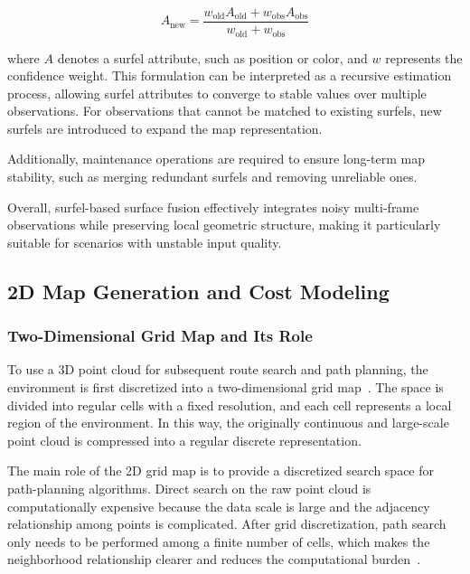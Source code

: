 \documentclass[12pt]{interim_report}
\begin{document}
\begin{equation}
A_{\text{new}} = \frac{w_{\text{old}} A_{\text{old}} + w_{\text{obs}} A_{\text{obs}}}{w_{\text{old}} + w_{\text{obs}}}
\end{equation}

where $A$ denotes a surfel attribute, such as position or color, and $w$ represents the confidence weight. This formulation can be interpreted as a recursive estimation process, allowing surfel attributes to converge to stable values over multiple observations. For observations that cannot be matched to existing surfels, new surfels are introduced to expand the map representation.

Additionally, maintenance operations are required to ensure long-term map stability, such as merging redundant surfels and removing unreliable ones.

Overall, surfel-based surface fusion effectively integrates noisy multi-frame observations while preserving local geometric structure, making it particularly suitable for scenarios with unstable input quality.

\subsection{2D Map Generation and Cost Modeling}
\label{subsec:2dmap-theory-zhuyu-dong}

\subsubsection{Two-Dimensional Grid Map and Its Role}

To use a 3D point cloud for subsequent route search and path planning, the environment is first discretized into a two-dimensional grid map~\cite{elfes1989occupancy}. The space is divided into regular cells with a fixed resolution, and each cell represents a local region of the environment. In this way, the originally continuous and large-scale point cloud is compressed into a regular discrete representation.

The main role of the 2D grid map is to provide a discretized search space for path-planning algorithms. Direct search on the raw point cloud is computationally expensive because the data scale is large and the adjacency relationship among points is complicated. After grid discretization, path search only needs to be performed among a finite number of cells, which makes the neighborhood relationship clearer and reduces the computational burden~\cite{elfes1989occupancy,gu2008traversability}.
\end{document}
